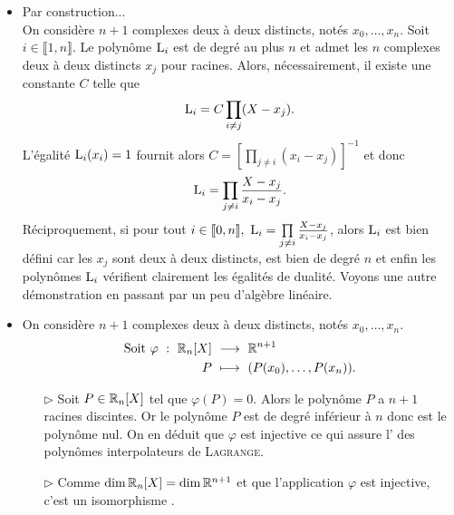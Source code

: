 

\begin{preuve}
\begin{itemize}
    \item Par construction...\cite{maths-france} \\
    On considère $n + 1$ complexes deux à deux distincts, notés $x_0, \dots, x_n$. Soit $i \in \llbracket 1, n \rrbracket$. Le polynôme $\mathrm{L}_i$ est de degré au plus $n$ et admet les $n$ complexes deux à deux distincts $x_j$ pour racines. Alors, nécessairement, il existe une constante $C$ telle que 
    $$\mathrm{L}_i = C \prod_{i \not= j} (X-x_j).$$
    L'égalité $\mathrm{L}_i(x_i) = 1$ fournit alors $C = \left[ \prod\limits_{j \not=i}(x_i - x_j) \right]^{-1}$ et donc 
    $$\mathrm{L}_i = \prod_{j \neq i} \frac{X-x_j}{x_i - x_j}.$$
    Réciproquement, si pour tout $i \in \llbracket 0, n\rrbracket,\ \mathrm{L}_i = \prod\limits_{j \neq i} \frac{X-x_j}{x_i - x_j}$, alors $\mathrm{L}_i$ est bien défini car les $x_j$ sont deux à deux distincts, est bien de degré $n$ et enfin les polynômes $\mathrm{L}_i$ vérifient clairement les égalités de dualité.
    \noindent Voyons une autre démonstration en passant par un peu d'algèbre linéaire.
    \item {}
    On considère $n + 1$ complexes deux à deux distincts, notés $x_0, \dots, x_n$.
    \begin{alignat*}{2}
        \text{Soit } \varphi\ :\ \R_n[X]\ &\longrightarrow\ \R^{n+1}\\
        P\ &\longmapsto\ (P(x_0), \dots, P(x_n)).
    \end{alignat*}
    \begin{itemize}
        \item[$\rhd$] Soit $P \in \mathbb{R}_n[X]$ tel que $\varphi(P) = 0$. Alors le polynôme $P$ a $n+1$ racines discintes. Or le polynôme $P$ est de degré inférieur à $n$ donc est le polynôme nul. On en déduit que $\varphi$ est injective ce qui assure l' des polynômes interpolateurs de \textsc{Lagrange}.
        \item[$\rhd$] Comme $\dim \mathbb{R}_n[X] = \dim \mathbb{R}^{n+1}$ et que l'application $\varphi$ est injective, c'est un isomorphisme \note.

\end{itemize}
\end{itemize}
\end{preuve}
